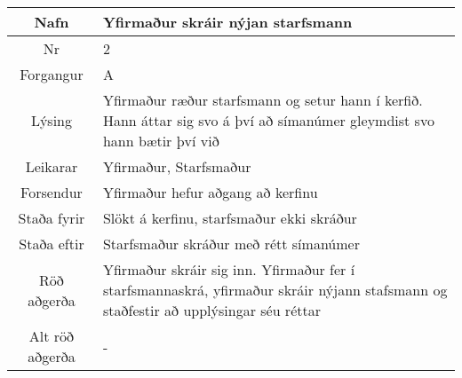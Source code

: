 \documentclass[a4paper]{article}
\begin{document}
\begin{tabular}{|c|p{10cm}|}
\hline
Nafn&Yfirmaður skráir nýjan starfsmann\\
\hline
Nr&2\\
\hline
Forgangur&A\\
\hline
Lýsing&Yfirmaður ræður starfsmann og setur hann í kerfið. Hann áttar sig svo á því að símanúmer gleymdist svo hann bætir því við\\
\hline
Leikarar&Yfirmaður, Starfsmaður\\
\hline
Forsendur&Yfirmaður hefur aðgang að kerfinu\\
\hline
Staða fyrir&Slökt á kerfinu, starfsmaður ekki skráður\\
\hline
Staða eftir&Starfsmaður skráður með rétt símanúmer\\
\hline
Röð aðgerða&Yfirmaður skráir sig inn. Yfirmaður fer í starfsmannaskrá, yfirmaður skráir nýjann stafsmann og staðfestir að upplýsingar séu réttar\\
\hline
Alt röð aðgerða&-\\
\hline
\end{tabular}
\end{document}
